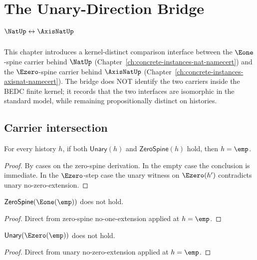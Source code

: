 \chapter{The Unary-Direction Bridge \(\NatUp \leftrightarrow \AxisNatUp\)}
\label{ch:concrete-instances-unary-direction-bridge}

This chapter introduces a kernel-distinct comparison interface between the \(\Eone\)-spine carrier behind \(\NatUp\) (Chapter~\ref{ch:concrete-instances-nat-namecert}) and the \(\Ezero\)-spine carrier behind \(\AxisNatUp\) (Chapter~\ref{ch:concrete-instances-axisnat-namecert}). The bridge does NOT identify the two carriers inside the BEDC finite kernel; it records that the two interfaces are isomorphic in the standard model, while remaining propositionally distinct on histories.

\section{Carrier intersection}

\begin{theorem}
\label{thm:unary-zero-spine-meet-only-at-empty}
For every history \(h\), if both \(\mathsf{Unary}(h)\) and \(\mathsf{ZeroSpine}(h)\) hold, then \(h = \emp\).
\end{theorem}
\begin{proof}
By cases on the zero-spine derivation. In the empty case the conclusion is immediate. In the \(\Ezero\)-step case the unary witness on \(\Ezero(h')\) contradicts unary no-zero-extension.
\end{proof}

\begin{lemma}
\label{lem:unary-eone-not-zero-spine}
\(\mathsf{ZeroSpine}(\Eone(\emp))\) does not hold.
\end{lemma}
\begin{proof}
Direct from zero-spine no-one-extension applied at \(h = \emp\).
\end{proof}

\begin{lemma}
\label{lem:zero-spine-ezero-not-unary}
\(\mathsf{Unary}(\Ezero(\emp))\) does not hold.
\end{lemma}
\begin{proof}
Direct from unary no-zero-extension applied at \(h = \emp\).
\end{proof}

